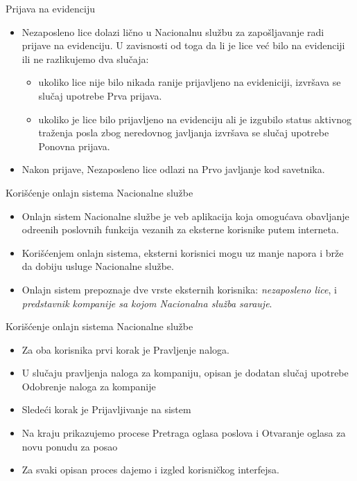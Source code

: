 \documentclass[11pt]{beamer}
\begin{document}
\begin{frame}{Prijava na evidenciju}
	\begin{itemize}
		\item Nezaposleno lice dolazi li\v cno u Nacionalnu slu\v zbu za zapo\v sljavanje radi prijave na evidenciju. U zavisnosti od toga da li je lice ve\' c bilo na evidenciji ili ne razlikujemo dva slu\v caja:
		\begin{itemize}
			\item ukoliko lice nije bilo nikada ranije prijavljeno na evideniciji, izvr\v sava se slu\v caj upotrebe Prva prijava.
			\item ukoliko je lice bilo prijavljeno na evidenciju ali je izgubilo status aktivnog tra\v zenja posla zbog neredovnog javljanja izvr\v sava se slu\v caj upotrebe Ponovna prijava.
		\end{itemize}
	\item Nakon prijave, Nezaposleno lice odlazi na Prvo javljanje kod savetnika.
	\end{itemize}
\end{frame}

\begin{frame}{Kori\v s\' cenje onlajn sistema Nacionalne slu\v zbe}
	\begin{itemize}
		\item Onlajn sistem Nacionalne slu\v zbe je veb aplikacija koja omogu\' cava obavljanje odre\dj enih poslovnih funkcija vezanih za eksterne korisnike putem interneta. 
		\item Kori\v s\' cenjem onlajn sistema, eksterni korisnici mogu uz manje napora i br\v ze da dobiju usluge Nacionalne slu\v zbe.
		
		\item Onlajn sistem prepoznaje dve vrste eksternih korisnika: \textit{nezaposleno lice}, i \textit{predstavnik kompanije sa kojom Nacionalna slu\v zba sara\dj uje}.
		
	\end{itemize}
\end{frame}

\begin{frame}{Kori\v s\' cenje onlajn sistema Nacionalne slu\v zbe}
	\begin{itemize}
		
		\item Za oba korisnika prvi korak je Pravljenje naloga. 
		\item U slu\v caju pravljenja naloga za kompaniju, opisan je dodatan slu\v caj upotrebe Odobrenje naloga za kompanije
		\item Slede\' ci korak je Prijavljivanje na sistem
		\item Na kraju prikazujemo procese Pretraga oglasa poslova i Otvaranje oglasa za novu ponudu za posao 
		\item Za svaki opisan proces dajemo i izgled korisni\v ckog interfejsa. 
	\end{itemize}
\end{frame}
\end{document}
